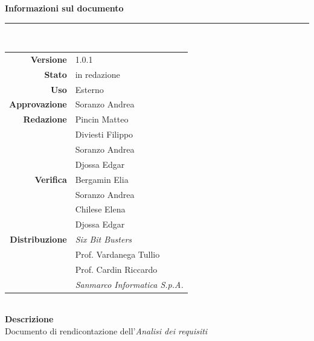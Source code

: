 \begin{titlepage}
\begin{center}
	\large \textbf{Informazioni sul documento} \\
	\rule{0.6\textwidth}{0.4pt}
	\\[0.5cm]
	\begin{tabular}{r|l}
		\textbf{Versione} & 1.0.1\\
		\textbf{Stato} & in redazione\\
		\textbf{Uso} & Esterno\\                         
		\textbf{Approvazione} & Soranzo Andrea\\                      
		\textbf{Redazione} & Pincin Matteo\\ & Diviesti Filippo\\ & Soranzo Andrea \\ & Djossa Edgar \\
		\textbf{Verifica} & Bergamin Elia\\ & Soranzo Andrea \\ & Chilese Elena \\  & Djossa Edgar \\                     
		\textbf{Distribuzione} & \textit{Six Bit Busters} \\ & Prof. Vardanega Tullio \\ & Prof. Cardin Riccardo \\ & \textit{Sanmarco Informatica S.p.A.}
	\end{tabular}	
	\\[0.8cm]

	\large \textbf{Descrizione} \\ Documento di rendicontazione dell'\textit{Analisi dei requisiti}
	
	\end{center}
\end{titlepage}
